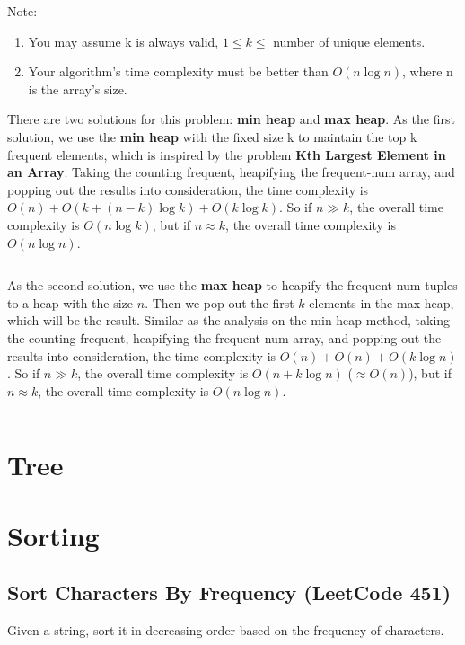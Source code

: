 \documentclass[11pt]{article}
\begin{document}
Note:
\begin{enumerate}
	\item You may assume k is always valid, $1 \leq k \leq $ number of unique elements.
	\item Your algorithm's time complexity must be better than $O(n \log n)$, where n is the array's size.
\end{enumerate}


There are two solutions for this problem: \textbf{min heap} and \textbf{max heap}. 
As the first solution, we use the \textbf{min heap} with the fixed size k to maintain the top k frequent elements, which is inspired by the problem \textbf{Kth Largest Element in an Array}.
Taking the counting frequent, heapifying the frequent-num array, and popping out the results into consideration, the time complexity is $O(n)+O(k+(n-k)\log k)+O(k \log k)$. 
So if $n \gg k$, the overall time complexity is $O(n \log k)$, but if $ n \approx k$, the overall time complexity is $O(n \log n)$.

\inputminted[breaklines=true,frame=leftline, linenos=true]{python}{src/topKFrequent.py}

As the second solution, we use the \textbf{max heap} to heapify the frequent-num tuples to a heap with the size $n$. 
Then we pop out the first $k$ elements in the max heap, which will be the result. Similar as the analysis on the min heap method, taking the counting frequent, heapifying the frequent-num array, and popping out the results into consideration, the time complexity is $O(n)+O(n)+O(k \log n)$. 
So if $n \gg k$, the overall time complexity is $O(n+k \log n)$ ($\approx O(n)$), but if $ n \approx k$, the overall time complexity is $O(n \log n)$.


\inputminted[breaklines=true,frame=leftline, linenos=true]{python}{src/topKFrequent_maxHeap.py}

\section{Tree}



\section{Sorting}
\subsection{Sort Characters By Frequency (LeetCode 451)}
Given a string, sort it in decreasing order based on the frequency of characters.
\end{document}
